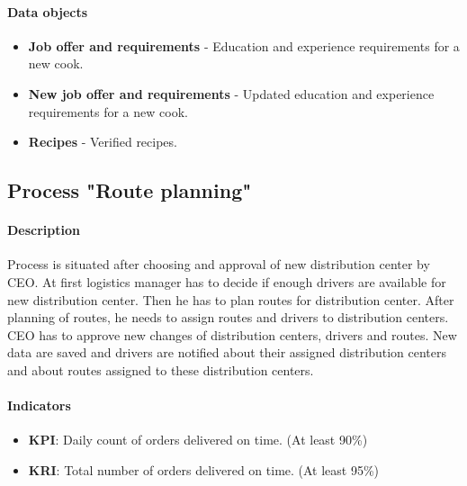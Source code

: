 \documentclass[11pt,a4paper]{article}
\begin{document}
\paragraph{Data objects}

\begin{itemize}
    \item \textbf{Job offer and requirements} - Education and experience requirements for a new cook.
    \item \textbf{New job offer and requirements} - Updated education and experience requirements for a new cook.
    \item \textbf{Recipes} - Verified recipes.
\end{itemize}

\newpage




\subsection{Process "Route planning"}

\paragraph{Description}

Process is situated after choosing and approval of new distribution center by CEO. At first logistics manager has to decide if enough drivers are available for new distribution center. Then he has to plan routes for distribution center. After planning of routes, he needs to assign routes and drivers to distribution centers. CEO has to approve new changes of distribution centers, drivers and routes. New data are saved and drivers are notified about their assigned distribution centers and about routes assigned to these distribution centers.

\paragraph{Indicators}

\begin{itemize}
    \item \textbf{KPI}: Daily count of orders delivered on time. (At least 90\%)
    \item \textbf{KRI}: Total number of orders delivered on time. (At least 95\%)
\end{itemize}
\end{document}
